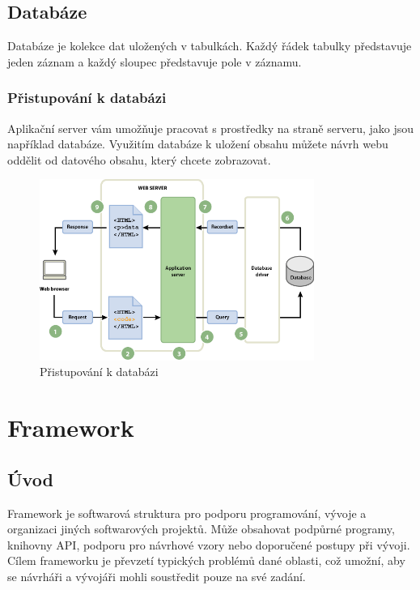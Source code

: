 \documentclass[12pt, a4paper,
twoside,        %
openright
]{report}
\begin{document}
\section{Databáze}
\label{databaze}

Databáze je kolekce dat uložených v tabulkách. Každý řádek tabulky představuje jeden záznam a každý sloupec představuje pole v záznamu.

\subsection{Přistupování k databázi}
Aplikační server vám umožňuje pracovat s prostředky na straně serveru, jako jsou například databáze. Využitím databáze k uložení obsahu můžete návrh webu oddělit od datového obsahu, který chcete zobrazovat.
	\begin{figure}[h!]
		\centering
		\includegraphics[width=0.8\textwidth]{image/databaze.png}
		\caption{Přistupování k databázi}
		\label{fig:pristupovanikdatabazi}
	\end{figure}

\chapter{Framework}

\section{Úvod}
\label{uvodframework}

Framework je softwarová struktura pro podporu programování, vývoje a organizaci jiných softwarových projektů. Může obsahovat podpůrné programy, knihovny API, podporu pro návrhové vzory nebo doporučené postupy při vývoji. Cílem frameworku je převzetí typických problémů dané oblasti, což umožní, aby se návrháři a vývojáři mohli soustředit pouze na své zadání.
\end{document}

